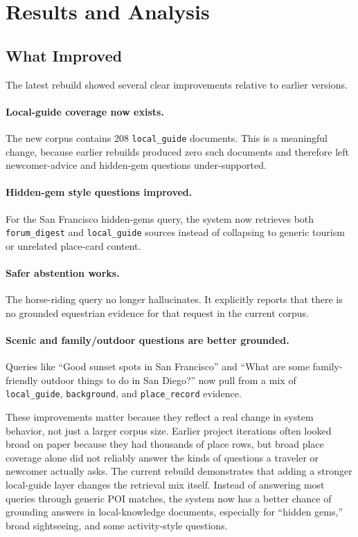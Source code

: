 \documentclass[11pt]{article}
\begin{document}
\section{Results and Analysis}
\subsection{What Improved}
The latest rebuild showed several clear improvements relative to earlier versions.

\paragraph{Local-guide coverage now exists.}
The new corpus contains 208 \texttt{local\_guide} documents. This is a meaningful change, because earlier rebuilds produced zero such documents and therefore left newcomer-advice and hidden-gem questions under-supported.

\paragraph{Hidden-gem style questions improved.}
For the San Francisco hidden-gems query, the system now retrieves both \texttt{forum\_digest} and \texttt{local\_guide} sources instead of collapsing to generic tourism or unrelated place-card content.

\paragraph{Safer abstention works.}
The horse-riding query no longer hallucinates. It explicitly reports that there is no grounded equestrian evidence for that request in the current corpus.

\paragraph{Scenic and family/outdoor questions are better grounded.}
Queries like ``Good sunset spots in San Francisco'' and ``What are some family-friendly outdoor things to do in San Diego?'' now pull from a mix of \texttt{local\_guide}, \texttt{background}, and \texttt{place\_record} evidence.

These improvements matter because they reflect a real change in system behavior, not just a larger corpus size. Earlier project iterations often looked broad on paper because they had thousands of place rows, but broad place coverage alone did not reliably answer the kinds of questions a traveler or newcomer actually asks. The current rebuild demonstrates that adding a stronger local-guide layer changes the retrieval mix itself. Instead of answering most queries through generic POI matches, the system now has a better chance of grounding answers in local-knowledge documents, especially for ``hidden gems,'' broad sightseeing, and some activity-style questions.
\end{document}
